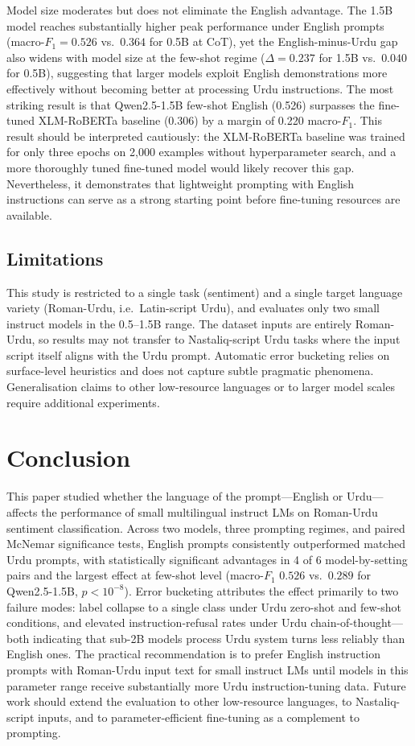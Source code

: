 \documentclass[conference]{IEEEtran}
\begin{document}
Model size moderates but does not eliminate the English advantage. The
1.5B model reaches substantially higher peak performance under English
prompts (macro-$F_1 = 0.526$ vs.\ $0.364$ for 0.5B at CoT), yet the
English-minus-Urdu gap also widens with model size at the few-shot regime
($\Delta = 0.237$ for 1.5B vs.\ $0.040$ for 0.5B), suggesting that larger
models exploit English demonstrations more effectively without becoming
better at processing Urdu instructions. The most striking result is that
Qwen2.5-1.5B few-shot English (0.526) surpasses the fine-tuned
XLM-RoBERTa baseline (0.306) by a margin of 0.220 macro-$F_1$. This
result should be interpreted cautiously: the XLM-RoBERTa baseline was
trained for only three epochs on 2,000 examples without hyperparameter
search, and a more thoroughly tuned fine-tuned model would likely recover
this gap. Nevertheless, it demonstrates that lightweight prompting with
English instructions can serve as a strong starting point before fine-tuning
resources are available.

\subsection{Limitations}
This study is restricted to a single task (sentiment) and a single target
language variety (Roman-Urdu, i.e.\ Latin-script Urdu), and evaluates
only two small instruct models in the 0.5--1.5B range. The dataset inputs
are entirely Roman-Urdu, so results may not transfer to Nastaliq-script
Urdu tasks where the input script itself aligns with the Urdu prompt. Automatic error
bucketing relies on surface-level heuristics and does not capture subtle
pragmatic phenomena. Generalisation claims to other low-resource languages
or to larger model scales require additional experiments.

\section{Conclusion}
This paper studied whether the language of the prompt---English or
Urdu---affects the performance of small multilingual instruct LMs on Roman-Urdu
sentiment classification. Across two models, three prompting regimes, and
paired McNemar significance tests, English prompts consistently outperformed
matched Urdu prompts, with statistically significant advantages in 4 of 6
model-by-setting pairs and the largest effect at few-shot level
(macro-$F_1$ $0.526$ vs.\ $0.289$ for Qwen2.5-1.5B, $p<10^{-8}$). Error
bucketing attributes the effect primarily to two failure modes: label
collapse to a single class under Urdu zero-shot and few-shot conditions,
and elevated instruction-refusal rates under Urdu chain-of-thought---both
indicating that sub-2B models process Urdu system turns less reliably than
English ones. The practical recommendation is to prefer English instruction
prompts with Roman-Urdu input text for small instruct LMs until models in
this parameter range receive substantially more Urdu instruction-tuning
data. Future work should extend the evaluation to other low-resource
languages, to Nastaliq-script inputs, and to parameter-efficient
fine-tuning as a complement to prompting.



\end{document}
